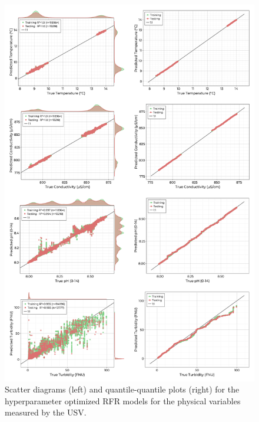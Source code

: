 \documentclass[remotesensing,article,submit,pdftex,moreauthors]{Definitions/mdpi}
\begin{document}
\begin{figure}[t!]
\centering
\vspace{-0.3in}
\includegraphics[width=0.9\columnwidth]{paper/figures/results/fits/physical-fitres.png}
\vspace{-0.2in}
\caption{Scatter diagrams (left) and quantile-quantile plots (right) for the hyperparameter optimized RFR models for the physical variables measured by the USV.\label{fig:physical-fit}}
\end{figure}  

\pagebreak
\end{document}
